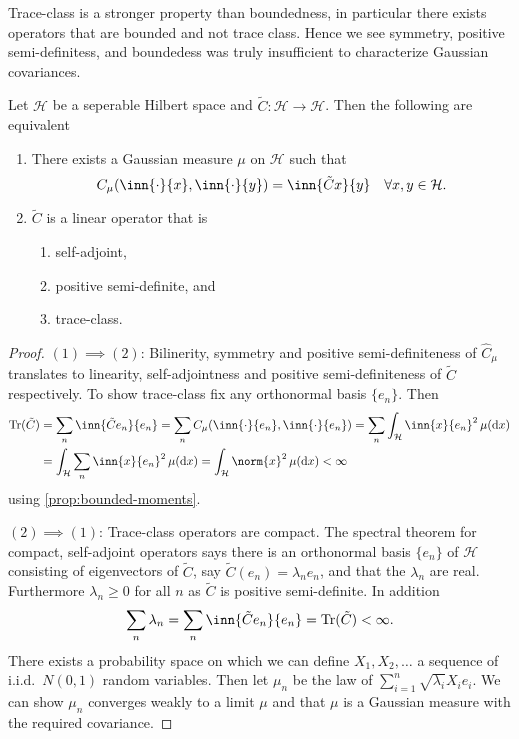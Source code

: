 \documentclass[fontsize=12pt, DIV=10]{scrreprt}
\theoremstyle{remark}
\newcommand{\calH}{\mathcal H}
\newcommand{\dif}[1]{\text{d} #1}
\DeclareMathOperator{\tr}{Tr}
\begin{document}
Trace-class is a stronger property than boundedness, in particular there exists operators that are bounded and not trace class. Hence we see symmetry, positive semi-definitess, and boundedess was truly insufficient to characterize Gaussian covariances.
\begin{prop}
	Let $\calH$ be a seperable Hilbert space and $\tilde{C}: \calH \to \calH$. Then the following are equivalent
	\begin{enumerate}
		\item There exists a Gaussian measure $\mu$ on $\calH$ such that
			\begin{equation}
				C_{\mu}(\inn{\cdot}{x}, \inn{\cdot}{y}) = \inn{\tilde{C} x}{y} \quad \forall x, y \in \calH.
			\end{equation}
		\item $\tilde{C}$ is a linear operator that is
			\begin{enumerate}
				\item self-adjoint,
				\item positive semi-definite, and
				\item trace-class.
			\end{enumerate}
	\end{enumerate}
\end{prop}
\begin{proof}
	$(1) \implies (2)$: Bilinerity, symmetry and positive semi-definiteness of $\hat{C}_{\mu}$ translates to linearity, self-adjointness and positive semi-definiteness of $\tilde{C}$ respectively. To show trace-class fix any orthonormal basis $\{e_n\}$. Then
	\begin{align}
		\tr(\tilde{C})
		&= \sum_n \inn{\tilde{C}e_n}{e_n}
		= \sum_n C_{\mu}(\inn{\cdot}{e_n}, \inn{\cdot}{e_n})
		= \sum_n \int_{\calH} \inn{x}{e_n}^2 \, \mu(\dif x) \nonumber \\
		&= \int_{\calH} \sum_n \inn{x}{e_n}^2 \, \mu(\dif x)
		= \int_{\calH} \norm{x}^2 \, \mu(\dif x) < \infty
	\end{align}
	using \vref{prop:bounded-moments}.

	$(2) \implies (1)$: Trace-class operators are compact. The spectral theorem for compact, self-adjoint operators says there is an orthonormal basis $\{e_n\}$ of $\calH$ consisting of eigenvectors of $\tilde{C}$, say $\tilde{C}(e_n) = \lambda _n e_n$, and that the $\lambda_n$ are real. Furthermore $\lambda_n \geq 0$ for all $n$ as $\tilde{C}$ is positive semi-definite. In addition
	\begin{equation}
		\sum_n \lambda_n = \sum_n \inn{\tilde{C} e_n}{e_n} = \tr(\tilde{C}) < \infty.
	\end{equation}
	There exists a probability space on which we can define $X_1, X_2, \ldots$ a sequence of i.i.d.\ $N(0, 1)$ random variables. Then let $\mu_n$ be the law of $\sum_{i=1}^n \sqrt{\lambda_i} X_i e_i$. We can show $\mu_n$ converges weakly to a limit $\mu$ and that $\mu$ is a Gaussian measure with the required covariance.
\end{proof}
\end{document}
